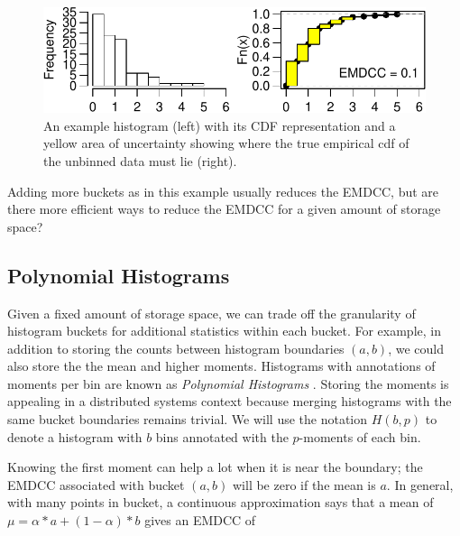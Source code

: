 \documentclass[preprint]{sig-alternate-per}
\begin{document}
\begin{figure}[h!]
\centering
\includegraphics[width=\linewidth]{exhists-crop.pdf}
\caption{An example histogram (left) with its CDF representation and a
  yellow area of uncertainty showing where the true empirical cdf of
  the unbinned data must lie (right).}
\label{fig:emdcc}
\end{figure}

Adding more buckets as in this example usually reduces the EMDCC, but
are there more efficient ways to reduce the EMDCC for a given amount
of storage space?

\subsection{Polynomial Histograms}

Given a fixed amount of storage space, we can trade off the granularity of
histogram buckets for additional statistics within each bucket.  For example,
in addition to storing the counts between histogram boundaries $(a, b)$, we
could also store the the mean and higher moments.  Histograms with
annotations of moments per bin are known as \emph{Polynomial
Histograms} \cite{sagae1997bin}.  Storing the moments is appealing in
a distributed systems context because merging histograms with the same
bucket boundaries remains trivial.  We will use the notation $H(b,p)$ to
denote a histogram with $b$ bins annotated with the $p$-moments of
each bin.

Knowing the first moment can help a lot when it is near the boundary; the
EMDCC associated with bucket $(a, b)$ will be zero if the mean is $a$.
In general, with many points in bucket, a continuous approximation says that a mean of $\mu = \alpha * a + (1-\alpha) * b$ gives an EMDCC of
\end{document}
